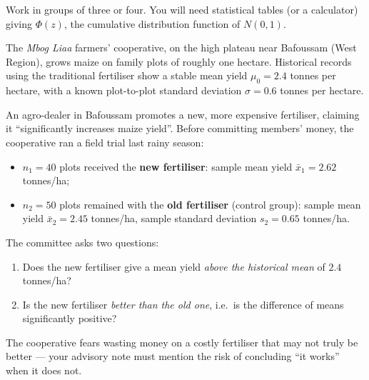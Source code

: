 \documentclass[11pt]{article}
\newcounter{popsec}
\newcounter{popsub}
\newcommand{\courssub}[1]{%
  \stepcounter{popsub}%
  \par\vspace{9pt}\noindent{\popxbold\fontsize{11.5}{13}\selectfont\color{popink}{\color{poporange}\thepopsec.\thepopsub}\hspace{6pt}#1}\par\nopagebreak\vspace{4pt}
}
\begin{document}
Work in groups of three or four. You will need statistical tables (or a calculator) giving $\Phi(z)$, the cumulative distribution function of $N(0,1)$.

\courssub{Context}

The \emph{Mbog Liaa} farmers' cooperative, on the high plateau near Bafoussam (West Region), grows maize on family plots of roughly one hectare. Historical records using the traditional fertiliser show a stable mean yield $\mu_0 = 2.4$ tonnes per hectare, with a known plot-to-plot standard deviation $\sigma = 0.6$ tonnes per hectare.

An agro-dealer in Bafoussam promotes a new, more expensive fertiliser, claiming it ``significantly increases maize yield''. Before committing members' money, the cooperative ran a field trial last rainy season:

\begin{itemize}
\item $n_1 = 40$ plots received the \textbf{new fertiliser}: sample mean yield $\bar{x}_1 = 2.62$ tonnes/ha;
\item $n_2 = 50$ plots remained with the \textbf{old fertiliser} (control group): sample mean yield $\bar{x}_2 = 2.45$ tonnes/ha, sample standard deviation $s_2 = 0.65$ tonnes/ha.
\end{itemize}

The committee asks two questions:
\begin{enumerate}
\item Does the new fertiliser give a mean yield \emph{above the historical mean} of $2.4$ tonnes/ha?
\item Is the new fertiliser \emph{better than the old one}, i.e.\ is the difference of means significantly positive?
\end{enumerate}

The cooperative fears wasting money on a costly fertiliser that may not truly be better — your advisory note must mention the risk of concluding ``it works'' when it does not.
\end{document}
